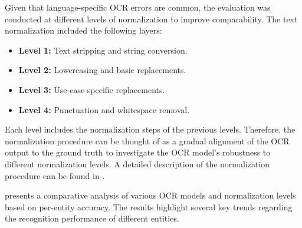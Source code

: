 \documentclass[11pt]{article}
\begin{document}
Given that language-specific OCR errors are common, the evaluation was conducted at different levels of normalization to improve comparability. The text normalization included the following layers:
\begin{itemize}
    \item \textbf{Level 1:} Text stripping and string conversion.
    \item \textbf{Level 2:} Lowercasing and basic replacements.
    \item \textbf{Level 3:} Use-case specific replacements.
    \item \textbf{Level 4:} Punctuation and whitespace removal.
\end{itemize}
Each level includes the normalization steps of the previous levels. Therefore, the normalization procedure can be thought of as a gradual alignment of the OCR output to the ground truth to investigate the OCR model's robustness to different normalization levels. A detailed description of the normalization procedure can be found in .

  presents a comparative analysis of various OCR models and normalization levels based on per-entity accuracy. The results highlight several key trends regarding the recognition performance of different entities.
\end{document}
